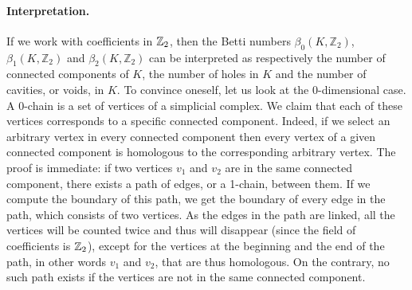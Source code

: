 
\paragraph*{Interpretation.}
If we work with coefficients in $\mathbb{Z}_2$, then
the Betti numbers $\beta_{0}(K,\mathbb{Z}_{2})$, $\beta_{1}(K,\mathbb{Z}_{2})$ and $\beta_{2}(K,\mathbb{Z}_{2})$ can be 
interpreted as respectively the number of connected components of $K$, the number of holes in $K$ and the number of cavities, 
or voids, in $K$. To convince oneself, let us look at the 0-dimensional case. A 0-chain is a set 
of vertices of a simplicial complex. We claim that each of these vertices corresponds to a specific 
connected component. Indeed, if we select an arbitrary vertex in every connected component then every 
vertex of a given connected component is homologous to the corresponding arbitrary vertex. The proof is immediate: if 
two vertices $v_{1}$ and $v_{2}$ are in the same connected component, there exists a path of edges, or a 1-chain, 
between them. If we compute the boundary of this path, we get the boundary of every edge in the path, which consists 
of two vertices. As the edges in the path are linked, all the vertices will be counted twice and thus will disappear
(since the field of coefficients is $\mathbb{Z}_2$), 
except for the vertices at the beginning and the end of the path, in other words $v_{1}$ and $v_{2}$, that are 
thus homologous. On the contrary, no such path exists if the vertices are not in the same connected component.

